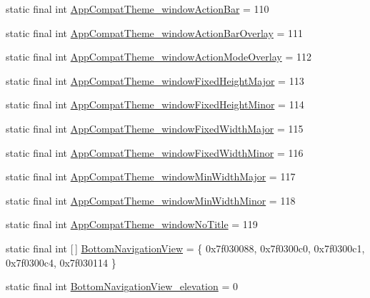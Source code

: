 \begin{DoxyCompactItemize}
static final int \mbox{\hyperlink{classandroid_1_1support_1_1design_1_1_r_1_1styleable_ab906c650ea56cb13ba044bfae2b0c5a8}{App\+Compat\+Theme\+\_\+window\+Action\+Bar}} = 110
\item 
static final int \mbox{\hyperlink{classandroid_1_1support_1_1design_1_1_r_1_1styleable_a71829623397abbbbab51409511d16792}{App\+Compat\+Theme\+\_\+window\+Action\+Bar\+Overlay}} = 111
\item 
static final int \mbox{\hyperlink{classandroid_1_1support_1_1design_1_1_r_1_1styleable_a84331b6298d479f0afe91973e5c8147a}{App\+Compat\+Theme\+\_\+window\+Action\+Mode\+Overlay}} = 112
\item 
static final int \mbox{\hyperlink{classandroid_1_1support_1_1design_1_1_r_1_1styleable_a5959da74bb48f413fc6dfea1f50b33f1}{App\+Compat\+Theme\+\_\+window\+Fixed\+Height\+Major}} = 113
\item 
static final int \mbox{\hyperlink{classandroid_1_1support_1_1design_1_1_r_1_1styleable_ac6eae65ae97acad480e341c691e1e0e3}{App\+Compat\+Theme\+\_\+window\+Fixed\+Height\+Minor}} = 114
\item 
static final int \mbox{\hyperlink{classandroid_1_1support_1_1design_1_1_r_1_1styleable_ac6994b7c630468c6c2ab7a17ed937160}{App\+Compat\+Theme\+\_\+window\+Fixed\+Width\+Major}} = 115
\item 
static final int \mbox{\hyperlink{classandroid_1_1support_1_1design_1_1_r_1_1styleable_a55ab1d572447b2b5a3dac90de5aaeda7}{App\+Compat\+Theme\+\_\+window\+Fixed\+Width\+Minor}} = 116
\item 
static final int \mbox{\hyperlink{classandroid_1_1support_1_1design_1_1_r_1_1styleable_ab1e522f74f4fa686373e34b0ad189b10}{App\+Compat\+Theme\+\_\+window\+Min\+Width\+Major}} = 117
\item 
static final int \mbox{\hyperlink{classandroid_1_1support_1_1design_1_1_r_1_1styleable_a4950ed5e7732a327332cea3555f2acc7}{App\+Compat\+Theme\+\_\+window\+Min\+Width\+Minor}} = 118
\item 
static final int \mbox{\hyperlink{classandroid_1_1support_1_1design_1_1_r_1_1styleable_a7f38f8c63670995f4f038c7be8cc6054}{App\+Compat\+Theme\+\_\+window\+No\+Title}} = 119
\item 
static final int \mbox{[}$\,$\mbox{]} \mbox{\hyperlink{classandroid_1_1support_1_1design_1_1_r_1_1styleable_a172fd3fafa033a32b591f783f5794d3e}{Bottom\+Navigation\+View}} = \{ 0x7f030088, 0x7f0300c0, 0x7f0300c1, 0x7f0300c4, 0x7f030114 \}
\item 
static final int \mbox{\hyperlink{classandroid_1_1support_1_1design_1_1_r_1_1styleable_a0967c8e2a809d8a08e983b3a70a13ab1}{Bottom\+Navigation\+View\+\_\+elevation}} = 0

\end{DoxyCompactItemize}
